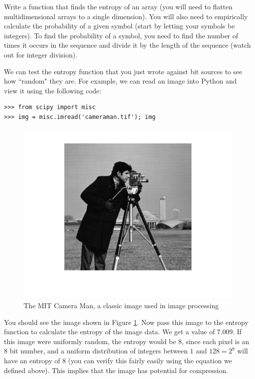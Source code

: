 \begin{problem}
Write a function that finds the entropy of an array (you will need to flatten multidimensional arrays to a single dimension). You will also need to empirically calculate the probability of a given symbol (start by letting your symbols be integers). To find the probability of a symbol, you need to find the number of times it occurs in the sequence and divide it by the length of the sequence (watch out for integer division).
\end{problem}

We can test the entropy function that you just wrote against bit sources to see how ``random" they are. For example, we can read an image into Python and view it using the following code:
\begin{lstlisting}
>>> from scipy import misc
>>> img = misc.imread('cameraman.tif'); img
\end{lstlisting}

\begin{figure}[h!]
\begin{center}
\includegraphics{cameramanClean.pdf}
\end{center}
\caption{The MIT Camera Man, a classic image used in image processing}
\label{fig:cameramanclean}
\end{figure}

You should see the image shown in Figure \ref{fig:cameramanclean}. Now pass this image to the entropy function to calculate the entropy of the image data. We get a value of $7.009$. If this image were uniformly random, the entropy would be $8$, since each pixel is an $8$ bit number, and a uniform distribution of integers between $1$ and $128 = 2^8$ will have an entropy of $8$ (you can verify this fairly easily using the equation we defined above). This implies that the image has potential for compression.

